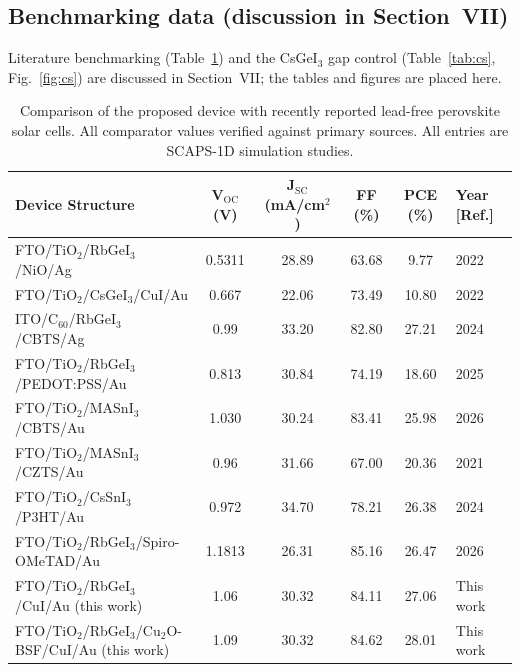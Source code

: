 \documentclass[aip,jap,amsmath,amssymb,preprint]{revtex4-2}
\begin{document}
\subsection{Benchmarking data (discussion in Section~VII)}
Literature benchmarking (Table~\ref{tab:bench}) and the CsGeI$_{3}$ gap control (Table~\ref{tab:cs}, Fig.~\ref{fig:cs}) are discussed in Section~VII; the tables and figures are placed here.

\begin{table}[htbp]
\centering
{\scriptsize\setlength{\tabcolsep}{2pt}
\begin{tabular*}{\textwidth}{@{\extracolsep{\fill}}lccccl}
\hline
Device Structure & V$_{\mathrm{OC}}$ (V) & J$_{\mathrm{SC}}$ (mA/cm$^{2}$) & FF (\%) & PCE (\%) & Year [Ref.]
\\\hline
FTO/\allowbreak{}TiO$_{2}$/RbGeI$_{3}$/NiO/\allowbreak{}Ag & 0.5311 & 28.89 & 63.68 & 9.77 & 2022 \cite{r14}\\
FTO/\allowbreak{}TiO$_{2}$/CsGeI$_{3}$/CuI/\allowbreak{}Au & 0.667 & 22.06 & 73.49 & 10.80 & 2022 \cite{r24}\\
ITO/\allowbreak{}C$_{60}$/RbGeI$_{3}$/CBTS/\allowbreak{}Ag & 0.99 & 33.20 & 82.80 & 27.21 & 2024 \cite{r22}\\
FTO/\allowbreak{}TiO$_{2}$/RbGeI$_{3}$/PEDOT:PSS/\allowbreak{}Au & 0.813 & 30.84 & 74.19 & 18.60 & 2025 \cite{r39}\\
FTO/\allowbreak{}TiO$_{2}$/MASnI$_{3}$/CBTS/\allowbreak{}Au & 1.030 & 30.24 & 83.41 & 25.98 & 2026 \cite{r41}\\
FTO/\allowbreak{}TiO$_{2}$/MASnI$_{3}$/CZTS/Au & 0.96 & 31.66 & 67.00 & 20.36 & 2021 \cite{r42}\\
FTO/\allowbreak{}TiO$_{2}$/CsSnI$_{3}$/P3HT/Au & 0.972 & 34.70 & 78.21 & 26.38 & 2024 \cite{r40}\\
FTO/\allowbreak{}TiO$_{2}$/RbGeI$_{3}$/Spiro-OMeTAD/\allowbreak{}Au & 1.1813 & 26.31 & 85.16 & 26.47 & 2026 \cite{r23}\\
FTO/\allowbreak{}TiO$_{2}$/RbGeI$_{3}$/CuI/\allowbreak{}Au (this work) & 1.06 & 30.32 & 84.11 & 27.06 & This work\\
FTO/\allowbreak{}TiO$_{2}$/RbGeI$_{3}$/Cu$_{2}$O-BSF/CuI/\allowbreak{}Au (this work) & 1.09 & 30.32 & 84.62 & 28.01 & This work\\
\hline
\end{tabular*}
}
\caption{Comparison of the proposed device with recently reported lead-free perovskite solar cells. All comparator values verified against primary sources. All entries are SCAPS-1D simulation studies.}
\label{tab:bench}
\end{table}
\end{document}
